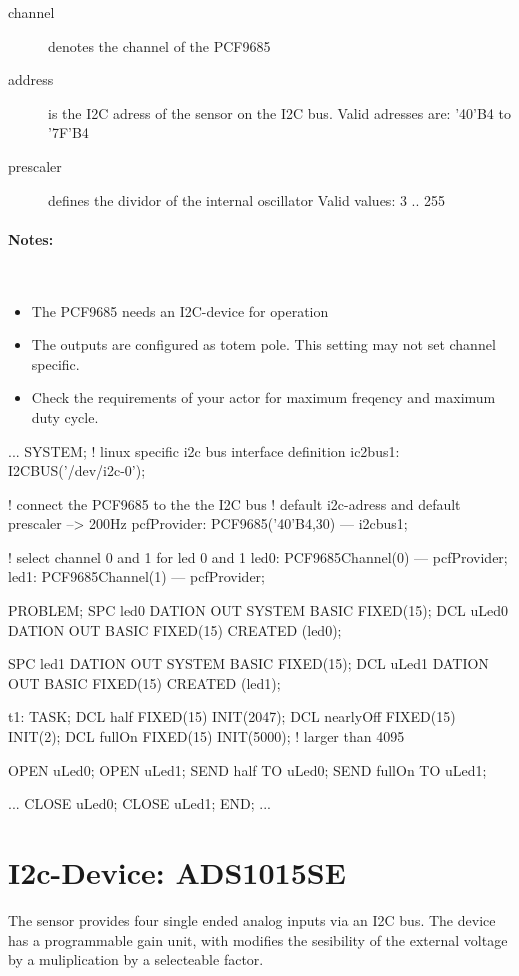 \begin{description}
\item[channel] denotes the channel of the PCF9685
\item[address] is the I2C adress of the sensor on the I2C bus.
   Valid adresses are: '40'B4 to '7F'B4
\item[prescaler] defines the dividor of the internal oscillator
   Valid values: 3 .. 255
\end{description}

\paragraph{Notes:}\ 
\begin{itemize}
\item The PCF9685 needs an I2C-device for operation
\item The outputs are configured as totem pole. This 
    setting may not set channel specific.
\item Check the requirements of your actor for maximum freqency
    and maximum duty cycle.
\end{itemize}

\begin{PEARLCode}
...
SYSTEM;
   ! linux specific i2c bus interface definition
   ic2bus1: I2CBUS('/dev/i2c-0');

   ! connect the PCF9685 to the the I2C bus
   ! default i2c-adress and default prescaler --> 200Hz
   pcfProvider: PCF9685('40'B4,30) --- i2cbus1;

   ! select channel 0 and 1 for led 0 and 1
   led0: PCF9685Channel(0) --- pcfProvider;
   led1: PCF9685Channel(1) --- pcfProvider;


PROBLEM;
   SPC led0 DATION OUT SYSTEM BASIC FIXED(15);
   DCL uLed0 DATION OUT BASIC FIXED(15) CREATED (led0);

   SPC led1 DATION OUT SYSTEM BASIC FIXED(15);
   DCL uLed1 DATION OUT BASIC FIXED(15) CREATED (led1);

t1: TASK;
   DCL half FIXED(15) INIT(2047);
   DCL nearlyOff FIXED(15) INIT(2);
   DCL fullOn FIXED(15) INIT(5000); ! larger than 4095

   OPEN uLed0;
   OPEN uLed1;
   SEND half   TO uLed0;  
   SEND fullOn TO uLed1;  

...
   CLOSE uLed0;
   CLOSE uLed1;
END;
...
\end{PEARLCode}

\section{I2c-Device: ADS1015SE}
The sensor provides four single ended analog inputs via an I2C bus.
The device  has a programmable gain unit, with modifies the sesibility
of the external voltage by a muliplication by a selecteable factor.

